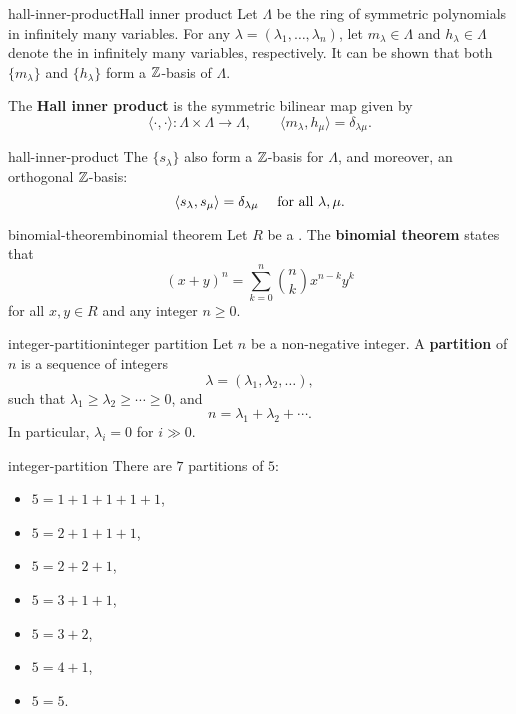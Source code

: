 \begin{topic}{hall-inner-product}{Hall inner product}
    Let $\Lambda$ be the ring of symmetric polynomials in infinitely many variables. For any  $\lambda = (\lambda_1, \ldots, \lambda_n)$, let $m_\lambda \in \Lambda$ and $h_\lambda \in \Lambda$ denote the  in infinitely many variables, respectively. It can be shown that both $\{ m_\lambda \}$ and $\{ h_\lambda \}$ form a $\mathbb{Z}$-basis of $\Lambda$.
    
    The \textbf{Hall inner product} is the symmetric bilinear map given by
    \[ \langle \cdot, \cdot \rangle : \Lambda \times \Lambda \to \Lambda, \qquad \langle m_\lambda, h_\mu \rangle = \delta_{\lambda \mu} . \]
\end{topic}

\begin{example}{hall-inner-product}
    The  $\{ s_\lambda \}$ also form a $\mathbb{Z}$-basis for $\Lambda$, and moreover, an orthogonal $\mathbb{Z}$-basis:
    \[ \langle s_\lambda, s_\mu \rangle = \delta_{\lambda \mu} \quad \textup{ for all } \lambda, \mu . \]
\end{example}

\begin{topic}{binomial-theorem}{binomial theorem}
    Let $R$ be a . The \textbf{binomial theorem} states that
    \[ (x + y)^n = \sum_{k = 0}^{n} \binom{n}{k} x^{n - k} y^k \]
    for all $x, y \in R$ and any integer $n \ge 0$.
\end{topic}

\begin{topic}{integer-partition}{integer partition}
    Let $n$ be a non-negative integer. A \textbf{partition} of $n$ is a sequence of integers
    \[ \lambda = (\lambda_1, \lambda_2, \ldots) , \]
    such that $\lambda_1 \ge \lambda_2 \ge \cdots \ge 0$, and
    \[ n = \lambda_1 + \lambda_2 + \cdots . \]
    In particular, $\lambda_i = 0$ for $i \gg 0$.
\end{topic}

\begin{example}{integer-partition}
    There are $7$ partitions of $5$:
    \begin{itemize}
        \item $5 = 1 + 1 + 1 + 1 + 1$,
        \item $5 = 2 + 1 + 1 + 1$,
        \item $5 = 2 + 2 + 1$,
        \item $5 = 3 + 1 + 1$,
        \item $5 = 3 + 2$,
        \item $5 = 4 + 1$,
        \item $5 = 5$.
    \end{itemize}
\end{example}
